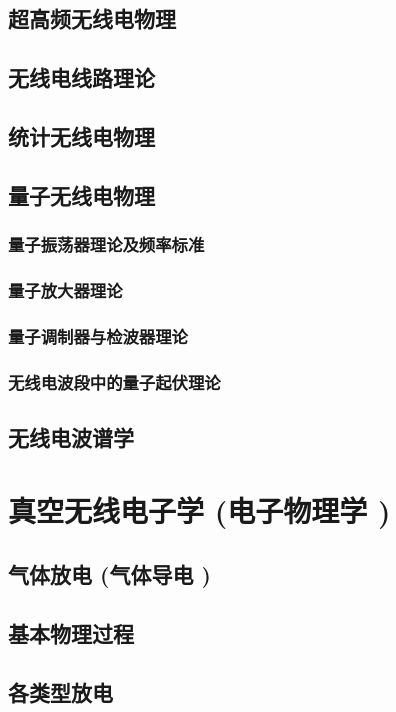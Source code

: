 \documentclass[UTF8]{../06-Physics}
\begin{document}
\section{超高频无线电物理}
\section{无线电线路理论}
\section{统计无线电物理}
\section{量子无线电物理}
    \subsection{量子振荡器理论及频率标准}
    \subsection{量子放大器理论}
    \subsection{量子调制器与检波器理论}
    \subsection{无线电波段中的量子起伏理论}
\section{无线电波谱学}






\chapter{真空无线电子学 (电子物理学 )}
\section{气体放电 (气体导电 )}
\section{基本物理过程}
\section{各类型放电}
\end{document}
